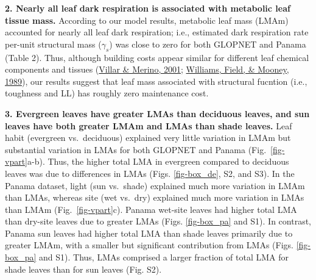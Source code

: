 \documentclass[
  12pt,
  letterpaper,
  DIV=11,
  numbers=noendperiod]{scrartcl}
\begin{document}
\textbf{2. Nearly all leaf dark respiration is associated with metabolic
leaf tissue mass.} According to our model results, metabolic leaf mass
(LMAm) accounted for nearly all leaf dark respiration; i.e., estimated
dark respiration rate per-unit structural mass (\(\gamma_s\)) was close
to zero for both GLOPNET and Panama (Table 2). Thus, although building
costs appear similar for different leaf chemical components and tissues
(\protect\hyperlink{ref-Villar2001}{Villar \& Merino, 2001};
\protect\hyperlink{ref-Williams1989}{Williams, Field, \& Mooney, 1989}),
our results suggest that leaf mass associated with structural fucntion
(i.e., toughness and LL) has roughly zero maintenance cost.

\textbf{3. Evergreen leaves have greater LMAs than deciduous leaves, and
sun leaves have both greater LMAm and LMAs than shade leaves.} Leaf
habit (evergreen vs.~deciduous) explained very little variation in LMAm
but substantial variation in LMAs for both GLOPNET and Panama
(Fig.~\ref{fig-vpart}a-b). Thus, the higher total LMA in evergreen
compared to deciduous leaves was due to differences in LMAs (Figs.
\ref{fig-box_de}, S2, and S3). In the Panama dataset, light (sun
vs.~shade) explained much more variation in LMAm than LMAs, whereas site
(wet vs.~dry) explained much more variation in LMAs than LMAm
(Fig.~\ref{fig-vpart}c). Panama wet-site leaves had higher total LMA
than dry-site leaves due to greater LMAs (Figs. \ref{fig-box_pa} and
S1). In contrast, Panama sun leaves had higher total LMA than shade
leaves primarily due to greater LMAm, with a smaller but significant
contribution from LMAs (Figs. \ref{fig-box_pa} and S1). Thus, LMAs
comprised a larger fraction of total LMA for shade leaves than for sun
leaves (Fig. S2).
\end{document}
